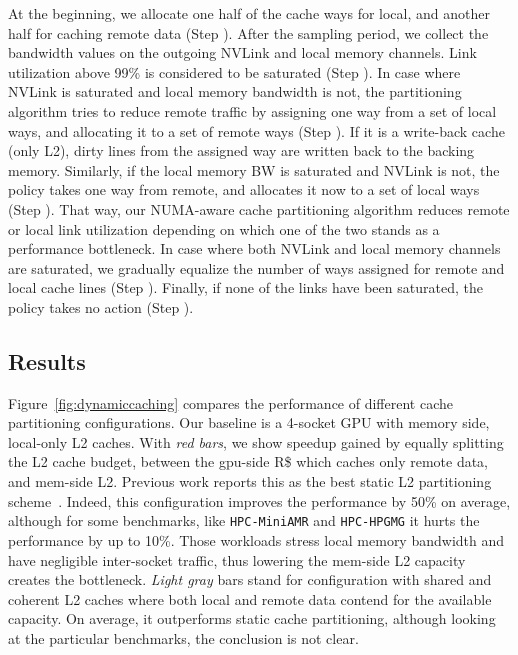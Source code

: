 At the beginning, we allocate one half of the cache ways for local, and another half for caching 
remote data (Step ). After the sampling period, we collect the 
bandwidth values on the outgoing NVLink and local memory channels. Link 
utilization above 99\% is considered to be saturated (Step ). 
In case where NVLink is saturated and local memory bandwidth is not, the 
partitioning algorithm tries to reduce remote traffic by assigning one way 
from a set of local ways, and allocating it to a set of remote ways 
(Step ). If it is a write-back cache (only L2), dirty lines from the 
assigned way are written back to the backing memory. Similarly, if the local 
memory BW is saturated and NVLink is not, the policy takes one way from 
remote, and allocates it now to a set of local ways (Step ). That way, our NUMA-aware cache partitioning algorithm reduces 
remote or local link utilization depending on which one of the two stands as 
a performance bottleneck. In case where both NVLink and local memory channels 
are saturated, we gradually equalize the number of ways assigned for remote 
and local cache lines (Step ). Finally, if none of the links have 
been saturated, the policy takes no action (Step ).


\subsection{Results}

Figure~\ref{fig:dynamiccaching} compares the performance of different cache partitioning configurations. Our baseline is a 4-socket GPU with memory side, local-only L2 caches. With \emph{red bars}, we show speedup gained by equally splitting the L2 cache budget, between the gpu-side R\$ which caches only remote data, and mem-side L2. Previous work reports this as the best static L2 partitioning scheme~\cite{Arunkumar2017}. Indeed, this configuration improves the performance by 50\% on average, although for some benchmarks, like \texttt{HPC-MiniAMR} and \texttt{HPC-HPGMG} it hurts the performance by up to 10\%. Those workloads stress local memory bandwidth and have negligible inter-socket traffic, thus lowering the mem-side L2 capacity creates the bottleneck. \emph{Light gray} bars stand for configuration with shared and coherent L2 caches where both local and remote data contend for the available capacity. On average, it outperforms static cache partitioning, although looking at the particular benchmarks, the conclusion is not clear.

